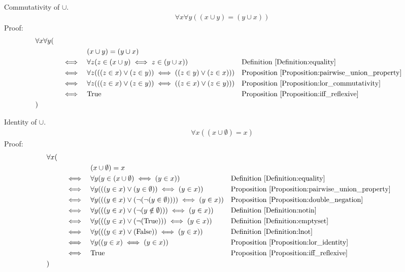 \begin{prop}
\label{Proposition:union_commutativity}
Commutativity of $\cup$.
\begin{align*}
\forall x \forall y ((x \cup y) = (y \cup x))
\end{align*}
Proof:
\begin{align*}
& \forall x \forall y ( \\
& \quad && && (x \cup y) = (y \cup x) \\
& \quad && \iff && \forall z (z \in (x \cup y) \iff z \in (y \cup x))
&& \text{Definition \ref{Definition:equality}} \\
& \quad && \iff && \forall z( ((z \in x) \lor (z \in y)) \iff ((z \in y) \lor (z \in x)) )
&& \text{Proposition \ref{Proposition:pairwise_union_property}} \\
& \quad && \iff && \forall z( ((z \in x) \lor (z \in y)) \iff ((z \in x) \lor (z \in y)) )
&& \text{Proposition \ref{Proposition:lor_commutativity}} \\
& \quad && \iff && \text{True}
&& \text{Proposition \ref{Proposition:iff_reflexive}} \\
& )
\end{align*}
\end{prop}

\begin{prop}
\label{Proposition:union_identity}
Identity of $\cup$.
\begin{align*}
\forall x ((x \cup \emptyset) = x)
\end{align*}
Proof:
\begin{align*}
& \forall x ( \\
& \quad && && (x \cup \emptyset) = x \\
& \quad && \iff && \forall y(y \in (x \cup \emptyset) \iff (y \in x))
&& \text{Definition \ref{Definition:equality}} \\
& \quad && \iff && \forall y(((y \in x) \lor (y \in \emptyset)) \iff (y \in x))
&& \text{Proposition \ref{Proposition:pairwise_union_property}} \\
& \quad && \iff && \forall y(((y \in x) \lor ( \lnot (\lnot (y \in \emptyset))) ) \iff (y \in x))
&& \text{Proposition \ref{Proposition:double_negation}} \\
& \quad && \iff && \forall y(((y \in x) \lor ( \lnot (y \notin \emptyset))) \iff (y \in x))
&& \text{Definition \ref{Definition:notin}} \\
& \quad && \iff && \forall y(((y \in x) \lor ( \lnot (\text{True}))) \iff (y \in x))
&& \text{Definition \ref{Definition:emptyset}} \\
& \quad && \iff && \forall y(((y \in x) \lor (\text{False})) \iff (y \in x))
&& \text{Definition \ref{Definition:lnot}} \\
& \quad && \iff && \forall y((y \in x) \iff (y \in x))
&& \text{Proposition \ref{Proposition:lor_identity}} \\
& \quad && \iff && \text{True}
&& \text{Proposition \ref{Proposition:iff_reflexive}} \\
& )
\end{align*}
\end{prop}

